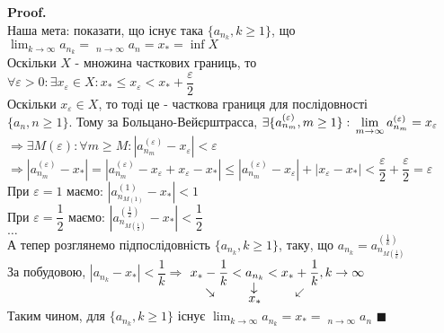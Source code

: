 \documentclass[a4paper, 14pt]{extarticle}
\DeclareMathOperator*\downlim{\underline{lim}}
\def\huge{\displaystyle}
\theoremstyle{theoremdd}
\theoremstyle{theoremdd}
\theoremstyle{theoremdd}
\theoremstyle{theoremdd}
\theoremstyle{theoremdd}
\theoremstyle{theoremdd}
\theoremstyle{theoremdd}
\theoremstyle{theoremdd}
\newenvironment{pf}{\vspace*{-3mm} \textbf{Proof. \\}}{$\blacksquare$}
\begin{document}
	\begin{pf}
	Наша мета: показати, що існує така $\{a_{n_k}, k \geq 1\}$, що \\ $\huge \lim_{k \to \infty} a_{n_k} = \downlim_{n \to \infty} a_n = x_* = \inf X$\\
	Оскільки $X$ - множина часткових границь, то\\
	$\forall \varepsilon > 0: \exists x_{\varepsilon} \in X: x_* \leq x_{\varepsilon} < x_* + \dfrac{\varepsilon}{2}$\\
	Оскільки $x_\varepsilon \in X$, то тоді це - часткова границя для послідовності \\ $\{a_n, n \geq 1\}$. Тому за Больцано-Вейєрштрасса, $\exists \{a_{n_m}^{(\varepsilon)}, m \geq 1\}: \huge \\ \lim_{m \to \infty} a_{n_m}^{(\varepsilon)} = x_{\varepsilon}$\\
	$\Rightarrow \exists M(\varepsilon): \forall m \geq M: |a_{n_m}^{(\varepsilon)} - x_{\varepsilon}| < \varepsilon$\\
	$\Rightarrow |a_{n_m}^{(\varepsilon)} - x_*| = |a_{n_m}^{(\varepsilon)} - x_{\varepsilon} + x_{\varepsilon} - x_*| \leq |a_{n_m}^{(\varepsilon)} - x_{\varepsilon}| + |x_{\varepsilon} - x_*| < \dfrac{\varepsilon}{2} + \dfrac{\varepsilon}{2} = \varepsilon$\\
	При $\varepsilon = 1$ маємо: $|a_{n_{M(1)}}^{(1)} - x_*| < 1$\\
	При $\varepsilon = \dfrac{1}{2}$ маємо: $|a_{n_{M(\frac{1}{2})}}^{(\frac{1}{2})} - x_*| < \dfrac{1}{2}$\\
	$\dots$\\
	А тепер розглянемо підпослідовність $\{a_{n_k}, k \geq 1\}$, таку, що $a_{n_k} = a_{n_{M(\frac{1}{k})}}^{(\frac{1}{k})}$\\
	За побудовою, $|a_{n_k} - x_*| < \dfrac{1}{k} \Rightarrow$ $\displaystyle \underset{\rotatebox[origin=c]{-45}{$\rightarrow$}}{x_*-\frac{1}{k}} < \underset{\underset{\displaystyle x_*}{\rotatebox[origin=c]{90}{$\leftarrow$}}}{a_{n_k}} < \underset{\rotatebox[origin=c]{45}{$\leftarrow$}}{x_*+\frac{1}{k}}, k \to \infty$\\
	Таким чином, для $\{a_{n_k}, k \geq 1\}$ існує $\huge \lim_{k \to \infty} a_{n_k} = x_* = \downlim_{n \to \infty} a_n$
	\end{pf}
	
\end{document}
